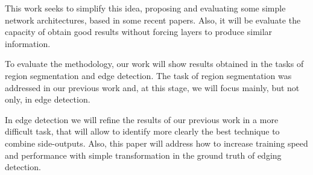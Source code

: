 {This work seeks to simplify this idea, proposing and evaluating some simple network architectures, based in some recent papers.
Also, it will be evaluate the capacity of obtain good results without forcing layers to produce similar information.

To evaluate the methodology, our work will show results obtained in the tasks of region segmentation and edge detection.
The task of region segmentation was addressed in our previous work \cite{Reis:2019} and, at this stage, we will focus mainly, but not only, in edge detection.
}

In edge detection we will refine the results of our previous work in a more difficult task, that will allow to identify more clearly the best technique to combine side-outputs.
Also, this paper will address how to increase training speed and performance with simple transformation in the ground truth of edging detection.

